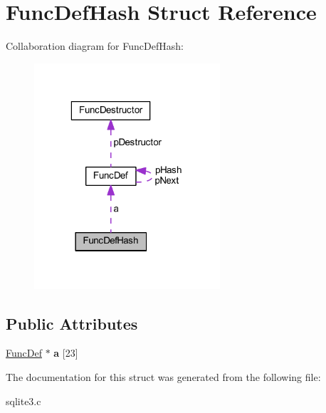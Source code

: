 \hypertarget{struct_func_def_hash}{\section{Func\-Def\-Hash Struct Reference}
\label{struct_func_def_hash}
}


Collaboration diagram for Func\-Def\-Hash\-:\nopagebreak
\begin{figure}[H]
\begin{center}
\leavevmode
\includegraphics[width=196pt]{struct_func_def_hash__coll__graph}
\end{center}
\end{figure}
\subsection*{Public Attributes}
\begin{DoxyCompactItemize}
\item 
\hypertarget{struct_func_def_hash_a3e044ccfe432770ef7297e86e405cc96}{\hyperlink{struct_func_def}{Func\-Def} $\ast$ {\bfseries a} \mbox{[}23\mbox{]}}\label{struct_func_def_hash_a3e044ccfe432770ef7297e86e405cc96}

\end{DoxyCompactItemize}


The documentation for this struct was generated from the following file\-:\begin{DoxyCompactItemize}
\item 
sqlite3.\-c\end{DoxyCompactItemize}
